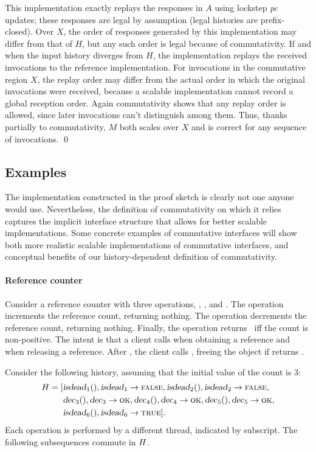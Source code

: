 \noindent
%
This implementation
%
exactly replays the responses in $A$ using lockstep \textit{pc}
updates; these responses are legal by assumption (legal histories are
prefix-closed).
%
Over $X$, the order of responses generated by this implementation may
differ from that of $H$, but any such order is legal because of
commutativity.
%
If and when the input history diverges from $H$, the implementation
replays the received invocations to the reference implementation.
%
For invocations in the commutative region $X$, the replay order may
differ from the actual order in which the original invocations were received, because a scalable
implementation cannot record a global reception order.
%
Again commutativity shows that any replay order is allowed, since later
invocations can't distinguish among them.
%
Thus, thanks partially to commutativity, $M$ both scales over $X$ and is
correct for any sequence of invocations. \qed

\subsection{Examples}

The implementation constructed in the proof sketch is clearly not one
anyone would use.
%
Nevertheless, the definition of commutativity on which it relies
captures the implicit interface structure that allows for better
scalable implementations.
%
Some concrete examples of commutative interfaces will show both more
realistic scalable implementations of commutative interfaces, and
conceptual benefits of our history-dependent definition of
commutativity.


\paragraph{Reference counter}

Consider a reference counter with three operations, , ,
and .
%
The  operation increments the reference count, returning
nothing.
%
The  operation decrements the reference count, returning
nothing.
%
Finally, the  operation returns \TRUE\ iff the count is
non-positive.
%
The intent is that a client calls  when obtaining a reference
and  when releasing a reference. After , the client
calls , freeing the object if  returns \TRUE.

Consider the following history, assuming that the initial value of the
count is 3:
%
\begin{align*}
H = [& \text{\textsl{isdead}}_{1}(), \text{\textsl{isdead}}_{1} \rightarrow \textsc{false},
	\text{\textsl{isdead}}_{2}(), \text{\textsl{isdead}}_{2} \rightarrow \textsc{false}, \\
	&\text{\textsl{dec}}_{3}(), \text{\textsl{dec}}_{3} \rightarrow \textsc{ok},
	\text{\textsl{dec}}_{4}(), \text{\textsl{dec}}_{4} \rightarrow \textsc{ok},
	\text{\textsl{dec}}_{5}(), \text{\textsl{dec}}_{5} \rightarrow \textsc{ok}, \\
        &\text{\textsl{isdead}}_{6}(), \text{\textsl{isdead}}_{6} \rightarrow \textsc{true}].
\end{align*}
%
Each operation is
performed by a different thread, indicated by subscript.
%
The following subsequences commute in $H$.

